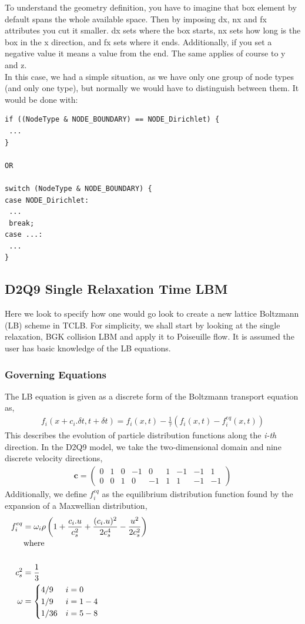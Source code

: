 \documentclass[12pt,a4paper]{report}
\begin{document}
To understand the geometry definition, you have to imagine that box element by default spans the whole available space. Then by imposing dx, nx and fx attributes you cut it smaller. dx sets where the box starts, nx sets how long is the box in the x direction, and fx sets where it ends. Additionally, if you set a negative value it means a value from the end. The same applies of course to y and z.\\

In this case, we had a simple situation, as we have only one group of node types (and only one type), but normally we would have to distinguish between them. It would be done with:
\begin{lstlisting}
if ((NodeType & NODE_BOUNDARY) == NODE_Dirichlet) {
 ...
}

OR

switch (NodeType & NODE_BOUNDARY) {
case NODE_Dirichlet:
 ...
 break;
case ...:
 ...
}
\end{lstlisting}
\newpage
\subsection{D2Q9 Single Relaxation Time LBM}
Here we look to specify how one would go look to create a new lattice Boltzmann (LB) scheme in TCLB. For simplicity, we shall start by looking at the single relaxation, BGK collision LBM and apply it to Poiseuille flow. It is assumed the user has basic knowledge of the LB equations.
\subsubsection{Governing Equations}
The LB equation is given as a discrete form of the Boltzmann transport equation as,
\begin{align*}
f_i (x+c_i.\delta t, t+\delta t) = f_i(x,t) - \frac{1}{\tau}(f_i(x,t) - f_i^{eq}(x,t))
\end{align*}
This describes the evolution of particle distribution functions along the \textit{i-th} direction. In the D2Q9 model, we take the two-dimensional domain and nine discrete velocity directions,
\begin{align*}
\mathbf{c} = \begin{pmatrix}
0 & 1 & 0 & -1 & 0 & 1 & -1 & -1 & 1 \\
0 & 0 & 1 & 0 & -1 & 1 & 1 & -1 & -1 
\end{pmatrix}
\end{align*}
Additionally, we define $f_i^{eq}$ as the equilibrium distribution function found by the expansion of a Maxwellian distribution,
\begin{align*}
f_i^{eq} &= \omega_i \rho \left( 1+\frac{c_i.u}{c_s^2} + \frac{(c_i.u)^2}{2c_s^4} - \frac{u^2}{2c_s^2}\right) \\
\noalign{\text{where}} \\
c_s^2 &= \frac{1}{3} \\
\omega &= \begin{cases}
4/9 	& i=0 \\
1/9		& i=1-4 \\
1/36	& i=5-8
\end{cases}
\end{align*}
\end{document}
